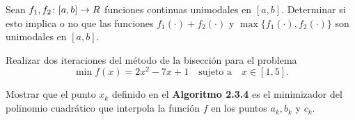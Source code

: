 \begin{exercise}\label{v2:ejer:2.3.6}
    Sean $f_1, f_2 \colon [a, b] \to R$ funciones continuas unimodales en $[a, b]$. Determinar si esto implica o no que las funciones $f_1(\cdot) + f_2(\cdot)$ y $\max\{f_1(\cdot), f_2(\cdot)\}$ son unimodales en $[a, b]$.
\end{exercise}

\begin{exercise}\label{v2:ejer:2.3.7}
    Realizar dos iteraciones del método de la bisección para el problema
    \[
        \min f(x) = 2x^2 - 7x + 1 \quad \text{sujeto a} \quad x \in [1, 5].
    \]
\end{exercise}

\begin{exercise}\label{v2:ejer:2.3.8}
    Mostrar que el punto $x_k$ definido en el \textbf{Algoritmo 2.3.4} es el minimizador del polinomio cuadrático que interpola la función $f$ en los puntos $a_k, b_k$ y $c_k$.
\end{exercise}
